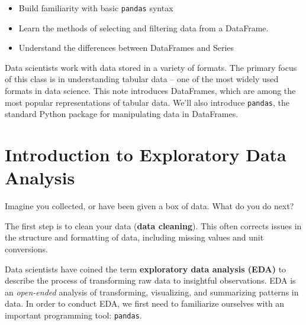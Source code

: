\documentclass[
  letterpaper,
  DIV=11,
  numbers=noendperiod]{scrreprt}
\providecommand{\tightlist}{%
  \setlength{\itemsep}{0pt}\setlength{\parskip}{0pt}}\usepackage{longtable,booktabs,array}
\begin{document}
\begin{tcolorbox}[enhanced jigsaw, left=2mm, leftrule=.75mm, title=\textcolor{quarto-callout-note-color}{\faInfo}\hspace{0.5em}{Note}, opacitybacktitle=0.6, colback=white, arc=.35mm, rightrule=.15mm, coltitle=black, colframe=quarto-callout-note-color-frame, toprule=.15mm, breakable, opacityback=0, toptitle=1mm, colbacktitle=quarto-callout-note-color!10!white, bottomtitle=1mm, titlerule=0mm, bottomrule=.15mm]

\begin{itemize}
\tightlist
\item
  Build familiarity with basic \texttt{pandas} syntax
\item
  Learn the methods of selecting and filtering data from a DataFrame.
\item
  Understand the differences between DataFrames and Series
\end{itemize}

\end{tcolorbox}

Data scientists work with data stored in a variety of formats. The
primary focus of this class is in understanding tabular data -- one of
the most widely used formats in data science. This note introduces
DataFrames, which are among the most popular representations of tabular
data. We'll also introduce \texttt{pandas}, the standard Python package
for manipulating data in DataFrames.

\hypertarget{introduction-to-exploratory-data-analysis}{%
\section{Introduction to Exploratory Data
Analysis}\label{introduction-to-exploratory-data-analysis}}

Imagine you collected, or have been given a box of data. What do you do
next?

The first step is to clean your data (\textbf{data cleaning}). This
often corrects issues in the structure and formatting of data, including
missing values and unit conversions.

Data scientists have coined the term \textbf{exploratory data analysis
(EDA)} to describe the process of transforming raw data to insightful
observations. EDA is an \emph{open-ended} analysis of transforming,
visualizing, and summarizing patterns in data. In order to conduct EDA,
we first need to familiarize ourselves with an important programming
tool: \texttt{pandas}.
\end{document}
